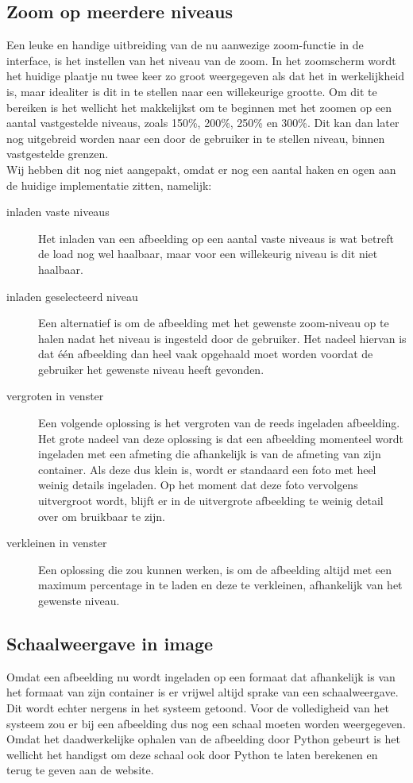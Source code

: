 \subsection{Zoom op meerdere niveaus}
Een leuke en handige uitbreiding van de nu aanwezige zoom-functie in de interface, is het instellen van het niveau van de zoom.
In het zoomscherm wordt het huidige plaatje nu twee keer zo groot weergegeven als dat het in werkelijkheid is, maar idealiter is dit in te stellen naar een willekeurige grootte.
Om dit te bereiken is het wellicht het makkelijkst om te beginnen met het zoomen op een aantal vastgestelde niveaus, zoals 150\%, 200\%, 250\% en 300\%.
Dit kan dan later nog uitgebreid worden naar een door de gebruiker in te stellen niveau, binnen vastgestelde grenzen.
\\
Wij hebben dit nog niet aangepakt, omdat er nog een aantal haken en ogen aan de huidige implementatie zitten, namelijk:
\begin{description}
	\item[inladen vaste niveaus] Het inladen van een afbeelding op een aantal vaste niveaus is wat betreft de load nog wel haalbaar, maar voor een willekeurig niveau is dit niet haalbaar.
	\item[inladen geselecteerd niveau] Een alternatief is om de afbeelding met het gewenste zoom-niveau op te halen nadat het niveau is ingesteld door de gebruiker.
	Het nadeel hiervan is dat \'{e}\'{e}n afbeelding dan heel vaak opgehaald moet worden voordat de gebruiker het gewenste niveau heeft gevonden.
	\item[vergroten in venster] Een volgende oplossing is het vergroten van de reeds ingeladen afbeelding.
	Het grote nadeel van deze oplossing is dat een afbeelding momenteel wordt ingeladen met een afmeting die afhankelijk is van de afmeting van zijn container.
Als deze dus klein is, wordt er standaard een foto met heel weinig details ingeladen.
Op het moment dat deze foto vervolgens uitvergroot wordt, blijft er in de uitvergrote afbeelding te weinig detail over om bruikbaar te zijn.
	\item[verkleinen in venster] Een oplossing die zou kunnen werken, is om de afbeelding altijd met een maximum percentage in te laden  en deze te verkleinen, afhankelijk van het gewenste niveau.
\end{description}

\subsection{Schaalweergave in image}
Omdat een afbeelding nu wordt ingeladen op een formaat dat afhankelijk is van het formaat van zijn container is er vrijwel altijd sprake van een schaalweergave.
Dit wordt echter nergens in het systeem getoond.
Voor de volledigheid van het systeem zou er  bij een afbeelding dus nog een schaal moeten worden weergegeven.
Omdat het daadwerkelijke ophalen van de afbeelding door Python gebeurt is het wellicht het handigst om deze schaal ook door Python te laten berekenen en terug te geven aan de website.

